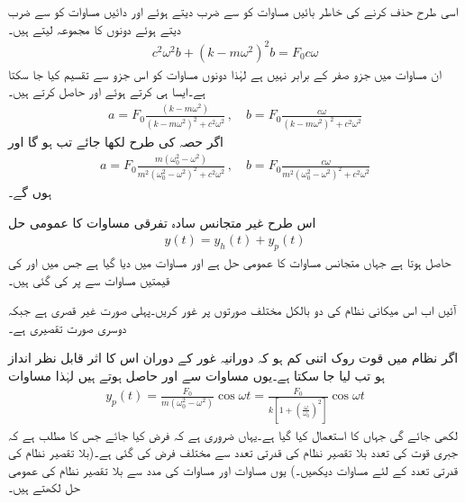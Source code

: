 اسی طرح  حذف کرنے کی خاطر بائیں مساوات کو  سے ضرب دیتے ہوئے اور دائیں مساوات کو  سے ضرب دیتے ہوئے دونوں کا مجموعہ لیتے ہیں۔
\begin{align*}
c^2\omega^2 b+(k-m\omega^2)^2b=F_0c\omega
\end{align*}
ان مساوات میں جزو  صفر کے برابر نہیں ہے لہٰذا دونوں مساوات کو اس جزو سے تقسیم کیا جا سکتا ہے۔ایسا ہی کرتے ہوئے  اور  حاصل کرتے ہیں۔
\begin{align*}
a=F_0\frac{(k-m\omega^2)}{(k-m\omega^2)^2+c^2\omega^2}\, , \quad b=F_0\frac{c\omega}{(k-m\omega^2)^2+c^2\omega^2}
\end{align*}
اگر حصہ  کی طرح  لکھا جائے تب  ہو گا اور 
\begin{align}\label{مساوات_سادہ_دو_نا_معلوم_عددی_سر_الف}
a=F_0\frac{m(\omega_0^2-\omega^2)}{m^2(\omega_0^2-\omega^2)^2+c^2\omega^2}\, , \quad b=F_0\frac{c\omega}{m^2(\omega_0^2-\omega^2)^2+c^2\omega^2}
\end{align}
ہوں گے۔

اس طرح غیر متجانس سادہ تفرقی مساوات  کا عمومی حل
\begin{align}\label{مساوات_سادہ_دو_نا_معلوم_عددی_سر_ب}
y(t)=y_h(t)+y_p(t)
\end{align}
حاصل ہوتا ہے جہاں  متجانس مساوات  کا عمومی حل ہے اور  مساوات  میں دیا گیا ہے جس میں  اور  کی قیمتیں مساوات  سے پر کی گئی ہیں۔

آئیں اب اس میکانی نظام کی دو بالکل مختلف صورتوں پر غور کریں۔پہلی صورت  غیر قصری ہے جبکہ دوسری صورت  تقصیری ہے۔

اگر نظام میں قوت روک اتنی کم ہو کہ دورانیہ غور کے دوران اس کا اثر قابل نظر انداز ہو تب  لیا جا سکتا ہے۔یوں مساوات  سے  اور  حاصل ہوتے ہیں لہٰذا مساوات 
\begin{align}\label{مساوات_سادہ_دو_بلا_تقصیر_حل_الف}
y_p(t)=\frac{F_0}{m(\omega_0^2-\omega^2)}\cos \omega t=\frac{F_0}{k[1+\left(\frac{\omega}{\omega_0}\right)^2]}\cos \omega t
\end{align}
لکھی جائے گی جہاں  کا استعمال کیا گیا ہے۔یہاں ضروری ہے کہ  فرض کیا جائے جس کا مطلب ہے کہ جبری قوت کی تعدد  بلا تقصیر نظام کی قدرتی تعدد  سے مختلف فرض کی گئی ہے۔(بلا تقصیر نظام کی قدرتی تعدد کے لئے  مساوات  دیکھیں۔) یوں مساوات   اور مساوات  کی مدد سے بلا تقصیر نظام کی عمومی حل لکھتے ہیں۔

